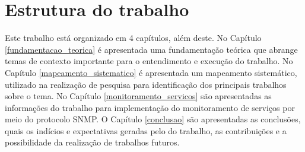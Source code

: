 







\section{Estrutura do trabalho}

Este trabalho está organizado em 4 capítulos, além deste. No Capítulo \ref{fundamentacao_teorica} é apresentada uma fundamentação teórica que abrange temas de contexto importante para o entendimento e execução do trabalho. No Capítulo \ref{mapeamento_sistematico} é apresentada um mapeamento sistemático, utilizado na realização de pesquisa para identificação dos principais trabalhos sobre o tema. No Capítulo \ref{monitoramento_servicos} são apresentadas as informações do trabalho para implementação do monitoramento de serviços por meio do protocolo \acrshort{SNMP}. O Capítulo \ref{conclusao} são apresentadas as conclusões, quais os indícios e expectativas geradas pelo do trabalho, as contribuições e a possibilidade da realização de trabalhos futuros.